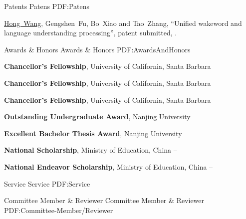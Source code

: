 \documentclass[letterpaper,MMMyyyy,nonstopmode]{simpleresumecv}
\begin{document}
\begin{Body}

\Section
{Patents}
{Patens}
{PDF:Patens}

\begin{enumerate}[label={[\arabic*]~~}]
\item
\underline{Hong~Wang}, Gengshen~Fu, Bo~Xiao and Tao~Zhang,
``Unified wakeword and language understanding processing'', patent submitted,
.
\end{enumerate}



\Section
{Awards \&\newline
Honors}
{Awards \& Honors}
{PDF:AwardsAndHonors}

\Entry
\textbf{Chancellor's Fellowship}, University of California, Santa Barbara
\hfill
{}

\Entry
\textbf{Chancellor's Fellowship}, University of California, Santa Barbara
\hfill
{}

\Gap
\Entry
\textbf{Chancellor's Fellowship}, University of California, Santa Barbara
\hfill
{}

\Gap
\Entry
\textbf{Outstanding Undergraduate Award}, Nanjing University
\hfill
{}

\Gap
\Entry
\textbf{Excellent Bachelor Thesis Award}, Nanjing University
\hfill
{}

\Gap
\Entry
\textbf{National Scholarship}, Ministry of Education, China
\hfill
{} -- 

\Gap
\Entry
\textbf{National Endeavor Scholarship}, Ministry of Education, China
\hfill
{} -- 

\Section
{Service}
{Service}
{PDF:Service}

\SubSection
{Committee Member \& Reviewer}
{Committee Member \& Reviewer}
{PDF:Committee-Member/Reviewer}


\end{Body}
\end{document}
